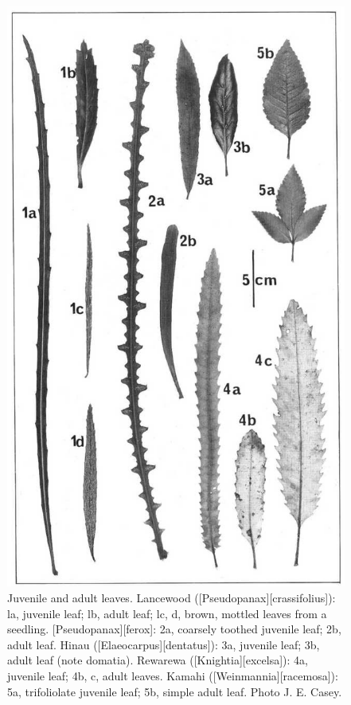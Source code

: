 \begin{figure}[!htb]
\begin{minipage}[t]{0.475\textwidth}
    	\includegraphics[height=1.4\textwidth]{graphics/figure19leaves.jpg}
    	\caption[Juvenile and adult leaves]{Juvenile and adult leaves.
        Lancewood ([Pseudopanax][crassifolius]): la, juvenile leaf; lb, adult leaf; lc, d, brown, mottled leaves from a seedling. [Pseudopanax][ferox]: 2a, coarsely toothed juvenile leaf; 2b, adult leaf.
        Hinau ([Elaeocarpus][dentatus]): 3a, juvenile leaf; 3b, adult leaf (note domatia).
        Rewarewa ([Knightia][excelsa]): 4a, juvenile leaf; 4b, c, adult leaves.
        Kamahi ([Weinmannia][racemosa]): 5a, trifoliolate juvenile leaf; 5b, simple adult leaf.
        Photo  J. E. Casey.}%
    	\label{fig:19leaves}
	\end{minipage}
\end{figure}

